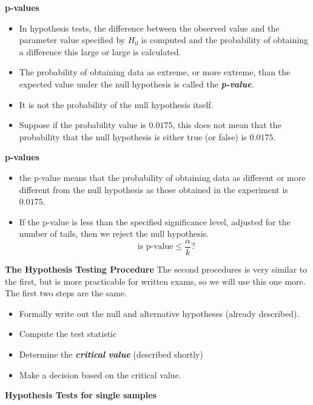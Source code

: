 \documentclass[a4]{beamer}
\begin{document}
\noindent \textbf{p-values}
\begin{itemize}
\item In hypothesis tests, the difference between the observed value and the parameter value specified by $H_0$ is computed and the probability of obtaining a difference this large or large is calculated.
\item The probability of obtaining data as extreme, or more extreme, than the expected value under the null hypothesis is called the \textbf{\emph{p-value}}.
\item It is not the probability of the null hypothesis itself.
\item Suppose if the probability value is $0.0175$, this does not mean that the probability that the null hypothesis is either true (or false) is $0.0175$.

\end{itemize}


\noindent \textbf{p-values}
\begin{itemize}
\item the p-value means that the probability of obtaining data as different or more different from the null hypothesis as those obtained in the experiment is $0.0175$.
\item If the p-value is less than the specified significance level, adjusted for the number of tails, then we reject the null hypothesis.
\[\mbox{ is p-value} \leq \frac{\alpha}{k} \mbox{?}\]
\end{itemize}



\noindent \textbf{The Hypothesis Testing Procedure }
The second procedures is very similar to the first, but is more practicable for written exams, so we will use this one more. The first two steps are the same.

\begin{itemize}
\item Formally write out the null and alternative hypotheses (already described).
\item Compute the test statistic
\item Determine the \emph{\textbf{critical value}} (described shortly)
\item Make a decision based on the critical value.
\end{itemize}




\noindent \textbf{Hypothesis Tests for single samples}
\end{document}
